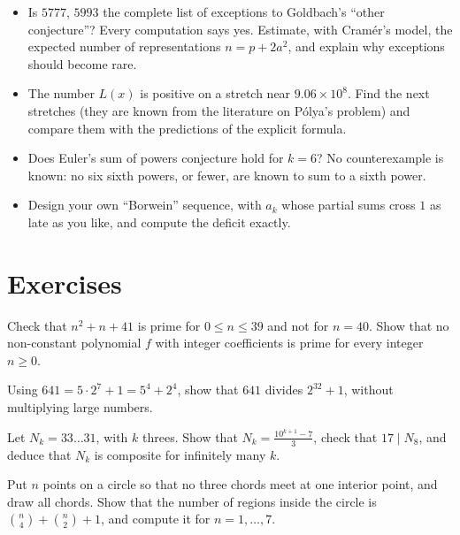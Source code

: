 \begin{itemize}
\item Is $5777$, $5993$ the complete list of exceptions to Goldbach's ``other conjecture''? Every computation says yes. Estimate, with Cram\'er's model, the expected
number of representations $n=p+2a^2$, and explain why exceptions should become rare.
\item The number $L(x)$ is positive on a stretch near $9.06\times10^8$. Find the next stretches (they are known from the literature on P\'olya's problem) and
compare them with the predictions of the explicit formula.
\item Does Euler's sum of powers conjecture hold for $k=6$? No counterexample is known: no six sixth powers, or fewer, are known to sum to a sixth power.
\item Design your own ``Borwein'' sequence, with $a_k$ whose partial sums cross $1$ as late as you like, and compute the deficit exactly.
\end{itemize}

\section{Exercises}

\begin{exercise}[$\star$]\label{conjectures:ex:euler41}
Check that $n^2+n+41$ is prime for $0\le n\le39$ and not for $n=40$. Show that no non-constant polynomial $f$ with integer coefficients is prime for every
integer $n\ge0$.
\end{exercise}

\begin{exercise}[$\star$]\label{conjectures:ex:fermat641}
Using $641=5\cdot2^7+1=5^4+2^4$, show that $641$ divides $2^{32}+1$, without multiplying large numbers.
\end{exercise}

\begin{exercise}[$\star$]\label{conjectures:ex:threes}
Let $N_k=33\ldots31$, with $k$ threes. Show that $N_k=\frac{10^{k+1}-7}3$, check that $17\mid N_8$, and deduce that $N_k$ is composite for infinitely many $k$.
\end{exercise}

\begin{exercise}[$\star\star$]\label{conjectures:ex:moser}
Put $n$ points on a circle so that no three chords meet at one interior point, and draw all chords. Show that the number of regions inside the circle is
$\binom n4+\binom n2+1$, and compute it for $n=1,\dots,7$.
\end{exercise}

